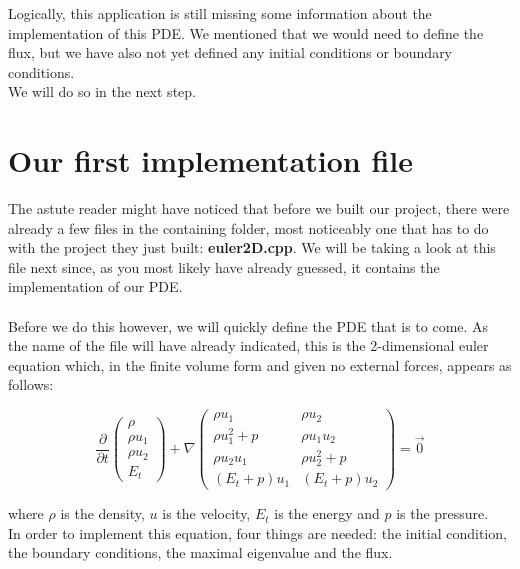 \documentclass[12pt,letterpaper]{article}
\begin{document}
Logically, this application is still missing some information about the implementation of this PDE. We mentioned that we would need to define the flux, but we have also not yet defined any initial conditions or boundary conditions.\\
We will do so in the next step.

\newpage

\section{Our first implementation file}

The astute reader might have noticed that before we built our project, there were already a few files in the containing folder, most noticeably one that has to do with the project they just built: \textbf{euler2D.cpp}. We will be taking a look at this file next since, as you most likely have already guessed, it contains the implementation of our PDE.
\\ \\
Before we do this however, we will quickly define the PDE that is to come. As the name of the file will have already indicated, this is the 2-dimensional euler equation which, in the finite volume form and given no external forces, appears as follows:

\begin{equation*} \label{Euler_equation}
    \frac{\partial}{\partial t}\left(
    \begin{array}{lr} \rho \\
                      \rho u_1 \\
                      \rho u_2 \\
                      E_t 
                      \end{array} \right) +
    \nabla \begin{pmatrix}
                      \rho u_1          & \rho u_2\\
                      \rho u_1^2 + p    & \rho u_1 u_2 \\
                      \rho u_2 u_1      & \rho u_2^2 + p \\
                      (E_t + p) u_1     & (E_t + p) u_2
    \end{pmatrix}  = \vec{0}
\end{equation*}

where $\rho$ is the density, $u$ is the velocity, $E_t$ is the energy and $p$ is the pressure.\\
In order to implement this equation, four things are needed: the initial condition, the boundary conditions, the maximal eigenvalue and the flux.\\
\end{document}
